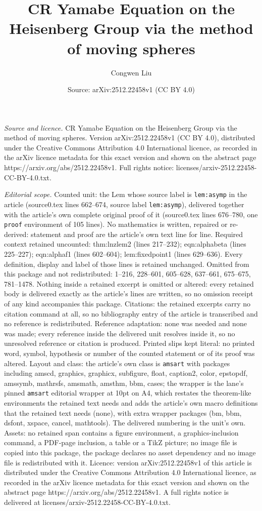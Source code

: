 \documentclass[10pt,a4paper]{amsart}
\title[CR Yamabe Equation on the Heisenberg Group via the method of]{CR Yamabe Equation on the Heisenberg Group via the method of moving spheres}
\author{Congwen Liu}
\date{Source: arXiv:2512.22458v1 (CC BY 4.0)}
\begin{document}
\maketitle

\noindent\emph{Source and licence.} CR Yamabe Equation on the Heisenberg Group via the method of moving spheres. Version arXiv:2512.22458v1 (CC BY 4.0), distributed under the Creative Commons Attribution 4.0 International licence, as recorded in the arXiv licence metadata for this exact version and shown on the abstract page https://arxiv.org/abs/2512.22458v1. Full rights notice: licenses/arxiv-2512.22458-CC-BY-4.0.txt.\par\smallskip

\noindent\textit{Editorial scope.} Counted unit: the Lem whose source label is \texttt{lem:asymp} in the article (source0.tex lines 662--674, source label \texttt{lem:asymp}), delivered together with the article's own complete original proof of it (source0.tex lines 676--780, one \texttt{proof} environment of 105 lines). No mathematics is written, repaired or re-derived: statement and proof are the article's own text line for line. Required context retained uncounted: thm:lnzlem2 (lines 217--232); eqn:alphabeta (lines 225--227); eqn:alphaf1 (lines 602--604); lem:fixedpoint1 (lines 629--636). Every definition, display and label of those lines is retained unchanged. Omitted from this package and not redistributed: 1--216, 228--601, 605--628, 637--661, 675--675, 781--1478. Nothing inside a retained excerpt is omitted or altered: every retained body is delivered exactly as the article's lines are written, so no omission receipt of any kind accompanies this package. Citations: the retained excerpts carry no citation command at all, so no bibliography entry of the article is transcribed and no reference is redistributed. Reference adaptation: none was needed and none was made; every reference inside the delivered unit resolves inside it, so no unresolved reference or citation is produced. Printed slips kept literal: no printed word, symbol, hypothesis or number of the counted statement or of its proof was altered. Layout and class: the article's own class is \texttt{amsart} with packages including amscd, graphics, graphicx, subfigure, float, caption2, color, epstopdf, amssymb, mathrsfs, amsmath, amsthm, bbm, cases; the wrapper is the lane's pinned \texttt{amsart} editorial wrapper at 10pt on A4, which restates the theorem-like environments the retained text needs and adds the article's own macro definitions that the retained text needs (none), with extra wrapper packages (bm, bbm, dsfont, xspace, cancel, mathtools). The delivered numbering is the unit's own. Assets: no retained span contains a figure environment, a graphics-inclusion command, a PDF-page inclusion, a table or a TikZ picture; no image file is copied into this package, the package declares no asset dependency and no image file is redistributed with it. Licence: version arXiv:2512.22458v1 of this article is distributed under the Creative Commons Attribution 4.0 International licence, as recorded in the arXiv licence metadata for this exact version and shown on the abstract page https://arxiv.org/abs/2512.22458v1. A full rights notice is delivered at licenses/arxiv-2512.22458-CC-BY-4.0.txt. 
\end{document}
